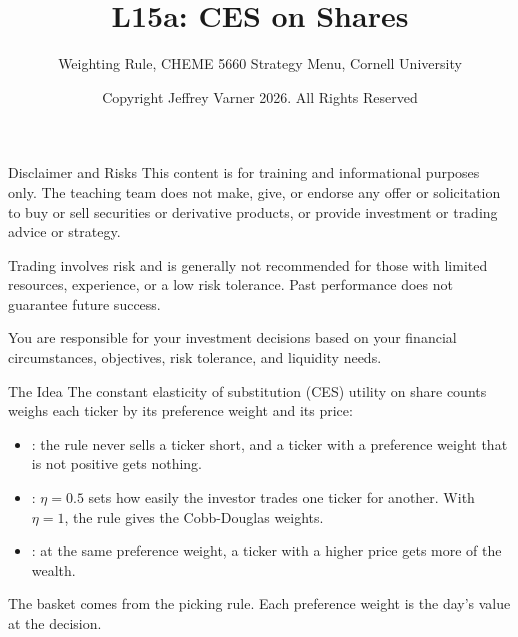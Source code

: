 \documentclass[aspectratio=169,11pt]{beamer}
\title{\texorpdfstring{{\vnheavy L15a}}{L15a}: CES on Shares}
\subtitle{Weighting Rule, CHEME 5660 Strategy Menu, Cornell University}
\author{Copyright Jeffrey Varner 2026. All Rights Reserved}
\begin{document}
\vntitlepage

\begin{frame}{Disclaimer and Risks}
  \vspace{0.6em}
  \textbf{} This content is for training and informational
  purposes only. The teaching team does not make, give, or endorse any offer or
  solicitation to buy or sell securities or derivative products, or provide
  investment or trading advice or strategy.

  \vspace{1.1em}
  \textbf{} Trading involves risk and is generally not recommended for
  those with limited resources, experience, or a low risk tolerance. Past
  performance does not guarantee future success.

  \vspace{1.1em}
  \textbf{} You are responsible for your investment decisions
  based on your financial circumstances, objectives, risk tolerance, and
  liquidity needs.
\end{frame}

\begin{frame}{The Idea}
  \vspace{0.3em}
  The constant elasticity of substitution (CES) utility on share counts weighs each ticker by its preference
  weight and its price:
  \begin{itemize}\setlength{\itemsep}{0.5em}
    \item {}: the rule never sells a ticker short, and a ticker with a preference weight that is not positive gets nothing.
    \item {}: $\eta=0.5$ sets how easily the investor trades one ticker for another. With $\eta=1$, the rule gives the Cobb-Douglas weights.
    \item {}: at the same preference weight, a ticker with a higher price gets more of the wealth.
  \end{itemize}

  \vspace{0.5em}
  The basket comes from the picking rule. Each preference weight is the day's value at the decision.
\end{frame}
\end{document}
